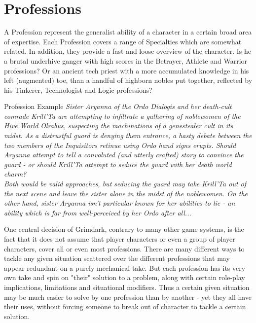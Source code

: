 \section{Professions} %
	\label{sec:professions}
	A Profession represent the generalist ability of a character in a certain broad area of expertise.
	Each Profession covers a range of Specialties which are somewhat related.
	In addition, they provide a fast and loose overview of the character.
	Is he a brutal underhive ganger with high scores in the Betrayer, Athlete and Warrior professions?
	Or an ancient tech priest with a more accumulated knowledge in his left (augmented) toe, than a handful of highborn nobles put together, reflected by his  Tinkerer, Technologist and Logic professions?
	\begin{DndSidebar}{Profession Example}
		\textit{Sister Aryanna of the Ordo Dialogis and her death-cult comrade Krill'Ta are attempting to infiltrate a gathering of noblewomen of the Hive World Olrabus, suspecting the machinations of a genestealer cult in its midst. As a distrustful guard is denying them entrance, a hasty debate between the two members of the Inquisitors retinue using Ordo hand signs erupts. Should Aryanna attempt to tell a convoluted (and utterly crafted) story to convince the guard - or should Krill'Ta attempt to seduce the guard with her death world charm?\\\noindent
		Both would be valid approaches, but seducing the guard may take Krill'Ta out of the next scene and leave the sister alone in the midst of the noblewomen. On the other hand, sister Aryanna isn't particular known for her abilities to lie - an ability which is far from well-perceived by her Ordo after all...\\}
	\end{DndSidebar}

	One central decision of Grimdark, contrary to many other game systems, is the fact that it does not assume that player characters or even a group of player characters, cover all or even most professions. 
	There are many different ways to tackle any given situation scattered over the different professions that may appear redundant on a purely mechanical take.
	But each profession has its very own take and spin on "their" solution to a problem, along with certain role-play implications, limitations and situational modifiers.
	Thus a certain given situation may be much easier to solve by one profession than by another - yet they all have their uses, without forcing someone to break out of character to tackle a certain solution.

